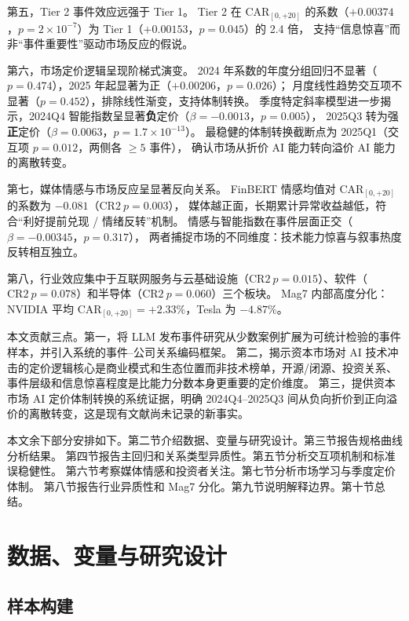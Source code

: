 \documentclass[11pt,fontset=fandol,a4paper]{ctexart}
\begin{document}
第五，Tier 2 事件效应远强于 Tier 1。
Tier 2 在 $\text{CAR}_{[0,+20]}$ 的系数（$+0.00374$，$p=2\times10^{-7}$）为 Tier 1（$+0.00153$，$p=0.045$）的 2.4 倍，
支持``信息惊喜''而非``事件重要性''驱动市场反应的假说。

第六，市场定价逻辑呈现阶梯式演变。
2024 年系数的年度分组回归不显著（$p=0.474$），2025 年起显著为正（$+0.00206$，$p=0.026$）；
月度线性趋势交互项不显著（$p=0.452$），排除线性渐变，支持体制转换。
季度特定斜率模型进一步揭示，2024Q4 智能指数呈显著\textbf{负}定价（$\beta=-0.0013$，$p=0.005$），
2025Q3 转为强\textbf{正}定价（$\beta=0.0063$，$p=1.7\times10^{-13}$）。
最稳健的体制转换截断点为 2025Q1（交互项 $p=0.012$，两侧各 $\geq5$ 事件），
确认市场从折价 AI 能力转向溢价 AI 能力的离散转变。

第七，媒体情感与市场反应呈显著反向关系。
FinBERT 情感均值对 $\text{CAR}_{[0,+20]}$ 的系数为 $-0.081$（$\text{CR2}\ p=0.003$），
媒体越正面，长期累计异常收益越低，符合``利好提前兑现 / 情绪反转''机制。
情感与智能指数在事件层面正交（$\beta=-0.00345$，$p=0.317$），
两者捕捉市场的不同维度：技术能力惊喜与叙事热度反转相互独立。

第八，行业效应集中于互联网服务与云基础设施（$\text{CR2}\ p=0.015$）、软件（$\text{CR2}\ p=0.078$）和半导体（$\text{CR2}\ p=0.060$）三个板块。
Mag7 内部高度分化：NVIDIA 平均 $\text{CAR}_{[0,+20]}=+2.33\%$，Tesla 为 $-4.87\%$。

本文贡献三点。第一，将 LLM 发布事件研究从少数案例扩展为可统计检验的事件样本，并引入系统的事件--公司关系编码框架。
第二，揭示资本市场对 AI 技术冲击的定价逻辑核心是商业模式和生态位置而非技术榜单，开源/闭源、投资关系、事件层级和信息惊喜程度是比能力分数本身更重要的定价维度。
第三，提供资本市场 AI 定价体制转换的系统证据，明确 2024Q4--2025Q3 间从负向折价到正向溢价的离散转变，这是现有文献尚未记录的新事实。

本文余下部分安排如下。第二节介绍数据、变量与研究设计。第三节报告规格曲线分析结果。
第四节报告主回归和关系类型异质性。第五节分析交互项机制和标准误稳健性。
第六节考察媒体情感和投资者关注。第七节分析市场学习与季度定价体制。
第八节报告行业异质性和 Mag7 分化。第九节说明解释边界。第十节总结。

\section{数据、变量与研究设计}

\subsection{样本构建}
\end{document}
